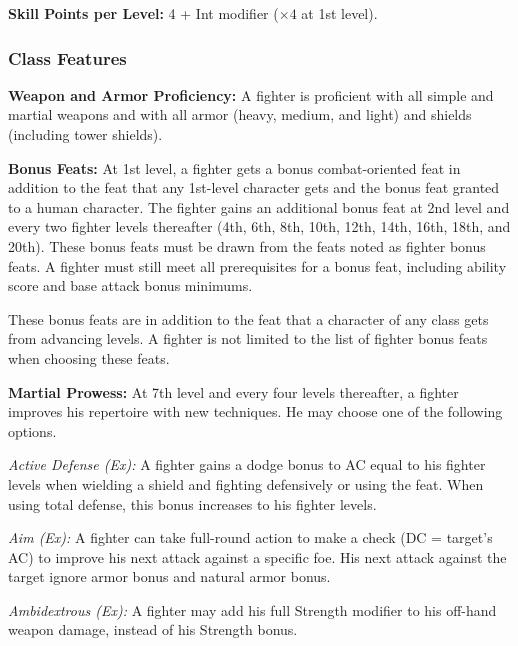 \textbf{Skill Points per Level:} 4 + Int modifier ($\times4$ at 1st level).

\subsubsection{Class Features}
\textbf{Weapon and Armor Proficiency:} A fighter is proficient with all simple and martial weapons and with all armor (heavy, medium, and light) and shields (including tower shields).

\textbf{Bonus Feats:} At 1st level, a fighter gets a bonus combat-oriented feat in addition to the feat that any 1st-level character gets and the bonus feat granted to a human character. The fighter gains an additional bonus feat at 2nd level and every two fighter levels thereafter (4th, 6th, 8th, 10th, 12th, 14th, 16th, 18th, and 20th). These bonus feats must be drawn from the feats noted as fighter bonus feats. A fighter must still meet all prerequisites for a bonus feat, including ability score and base attack bonus minimums.

These bonus feats are in addition to the feat that a character of any class gets from advancing levels. A fighter is not limited to the list of fighter bonus feats when choosing these feats.


\textbf{Martial Prowess:} At 7th level and every four levels thereafter, a fighter improves his repertoire with new techniques. He may choose one of the following options.

\textit{Active Defense (Ex):} A fighter gains a dodge bonus to AC equal to \onequarter his fighter levels when wielding a shield and fighting defensively or using the  feat. When using total defense, this bonus increases to \onehalf his fighter levels.

\textit{Aim (Ex):} A fighter can take full-round action to make a  check (DC = target's AC) to improve his next attack against a specific foe. His next attack against the target ignore armor bonus and natural armor bonus.

\textit{Ambidextrous (Ex):} A fighter may add his full Strength modifier to his off-hand weapon damage, instead of \onehalf his Strength bonus.

